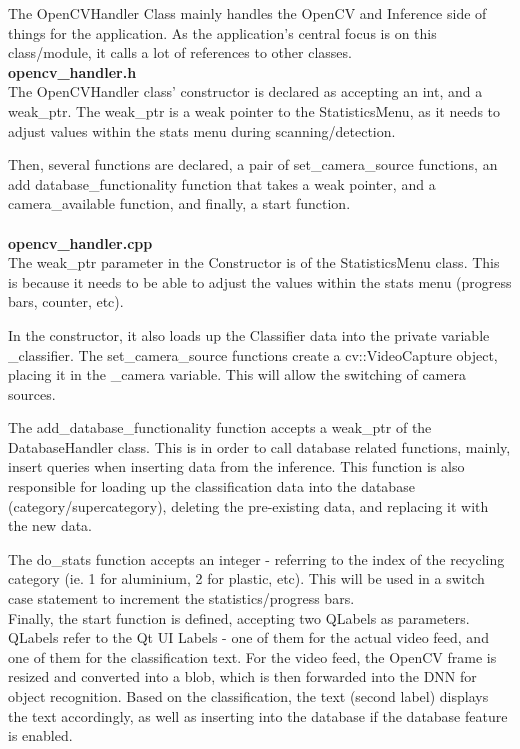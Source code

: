 \documentclass[conference]{IEEEtran}
\begin{document}
The OpenCVHandler Class mainly handles the OpenCV and Inference side of things for the application. As the application's central focus is on this class/module, it calls a lot of references to other classes.\\


\textbf{opencv\_handler.h}~\\

The OpenCVHandler class' constructor is declared as accepting an int, and a weak\_ptr. The weak\_ptr is a weak pointer to the StatisticsMenu, as it needs to adjust values within the stats menu during scanning/detection.

Then, several functions are declared, a pair of set\_camera\_source functions, an add database\_functionality function that takes a weak pointer, and a camera\_available function, and finally, a start function.~\\~\\


\textbf{opencv\_handler.cpp}~\\

The weak\_ptr parameter in the Constructor is of the StatisticsMenu class. This is because it needs to be able to adjust the values within the stats menu (progress bars, counter, etc).

In the constructor, it also loads up the Classifier data into the private variable \_classifier. The set\_camera\_source functions create a cv::VideoCapture object, placing it in the \_camera variable. This will allow the switching of camera sources.

The add\_database\_functionality function accepts a weak\_ptr of the DatabaseHandler class. This is in order to call database related functions, mainly, insert queries when inserting data from the inference. This function is also responsible for loading up the classification data into the database (category/supercategory), deleting the pre-existing data, and replacing it with the new data.

The do\_stats function accepts an integer - referring to the index of the recycling category (ie. 1 for aluminium, 2 for plastic, etc). This will be used in a switch case statement to increment the statistics/progress bars.\\

Finally, the start function is defined, accepting two QLabels as parameters. QLabels refer to the Qt UI Labels - one of them for the actual video feed, and one of them for the classification text. For the video feed, the OpenCV frame is resized and converted into a blob, which is then forwarded into the DNN for object recognition. Based on the classification, the text (second label) displays the text accordingly, as well as inserting into the database if the database feature is enabled.
\end{document}

